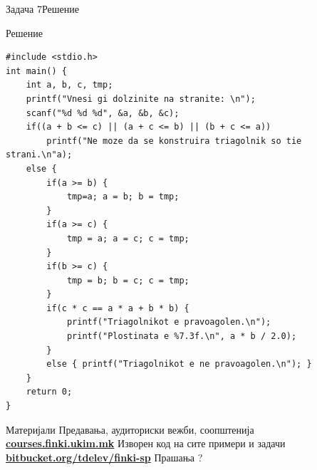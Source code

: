 \begin{frame}[fragile,shrink=30]{Задача 7}{Решение}
    \begin{exampleblock}{Решение}
\begin{lstlisting}
#include <stdio.h> 
int main() {
    int a, b, c, tmp;
    printf("Vnesi gi dolzinite na stranite: \n");
    scanf("%d %d %d", &a, &b, &c);
    if((a + b <= c) || (a + c <= b) || (b + c <= a))
        printf("Ne moze da se konstruira triagolnik so tie strani.\n"a);
    else {
        if(a >= b) {
            tmp=a; a = b; b = tmp;
        }
        if(a >= c) {
            tmp = a; a = c; c = tmp;
        }
        if(b >= c) {
            tmp = b; b = c; c = tmp;
        }
        if(c * c == a * a + b * b) {
            printf("Triagolnikot e pravoagolen.\n");
            printf("Plostinata e %7.3f.\n", a * b / 2.0);
        }
        else { printf("Triagolnikot e ne pravoagolen.\n"); }
    }
    return 0;
}
        \end{lstlisting}
    \end{exampleblock}
\end{frame}

\begin{frame}{Материјали}{}
    Предавања, аудиториски вежби, соопштенија\\
    \href{http://courses.finki.ukim.mk/}{\textbf{courses.finki.ukim.mk}}
    \vfill
    Изворен код на сите примери и задачи\\
    \href{http://bitbucket.org/tdelev/finki-krs/}{\textbf{bitbucket.org/tdelev/finki-sp}}
    \vfill
    {\Huge Прашања ?}
\end{frame}